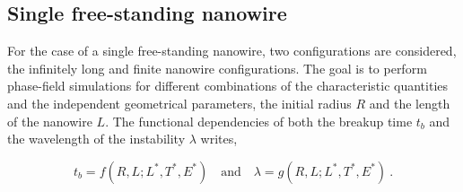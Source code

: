 \subsection{Single free-standing nanowire}
For the case of a single free-standing nanowire, two configurations are considered, the infinitely long and finite nanowire configurations. The goal is to perform phase-field simulations for different combinations of the characteristic quantities and the independent geometrical parameters, the initial radius $R$ and the length of the nanowire $L$. The functional dependencies of both the breakup time $t_b$ and the wavelength of the instability $\lambda$ writes,

\begin{equation}
    t_{b} = f(R, L; L^*, T^*, E^*) \quad \text{and} \quad \lambda = g(R, L; L^*, T^*, E^*)\ .
\end{equation}

